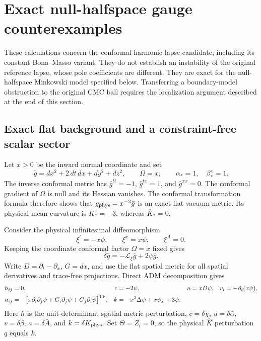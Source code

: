 \section{Exact null-halfspace gauge counterexamples}
\label{sec:gauge-counterexamples}

These calculations concern the conformal-harmonic lapse candidate, including
its constant Bona--Masso variant.  They do not establish an instability of the
original reference lapse, whose pole coefficients are different.  They are
exact for the null-halfspace Minkowski model specified below.  Transferring a
boundary-model obstruction to the original CMC ball requires the localization
argument described at the end of this section.

\subsection{Exact flat background and a constraint-free scalar sector}

Let $x>0$ be the inward normal coordinate and set
\[
 \bar g=dx^2+2\,dt\,dx+dy^2+dz^2,\qquad \Omega=x,
 \qquad \alpha_*=1,\quad \beta_*^x=1.
\]
The inverse conformal metric has $\bar g^{tt}=-1$,
$\bar g^{tx}=1$, and $\bar g^{xx}=0$.  The conformal gradient of $\Omega$
is null and its Hessian vanishes.  The conformal transformation formula
therefore shows that $g_{\rm phys}=x^{-2}\bar g$ is an exact flat vacuum metric.
Its physical mean curvature is $K_*=-3$, whereas $\bar K_*=0$.

Consider the physical infinitesimal diffeomorphism
\[
 \xi^t=-x\psi,\qquad \xi^x=x\psi,\qquad \xi^A=0.
\]
Keeping the coordinate conformal factor $\Omega=x$ fixed gives
\[
 \delta\bar g=-\mathcal L_\xi\bar g+2\psi\bar g.
\]
Write $D=\partial_t-\partial_x$, $G=dx$, and use the flat spatial metric
for all spatial derivatives and trace-free projections.  Direct ADM
decomposition gives
\begin{align}
 h_{ij}&=0,& c&=-2\psi,& u&=xD\psi,&
 v_i&=-\partial_i(x\psi),\label{eq:halfspace-gauge-fields}\\
 a_{ij}&=-\big[x\partial_i\partial_j\psi+
 G_i\partial_j\psi+G_j\partial_i\psi\big]^{\rm TF},
 & k&=-x^2\Delta\psi+x\psi_x+3\psi.
 \label{eq:halfspace-gauge-curvature}
\end{align}
Here $h$ is the unit-determinant spatial metric perturbation,
$c=\delta\chi$, $u=\delta\bar\alpha$, $v=\delta\beta$,
$a=\delta\bar A$, and $k=\delta K_{\rm phys}$.  Set
$\Theta=Z_i=0$, so the physical $\hat K$ perturbation $q$ equals $k$.

